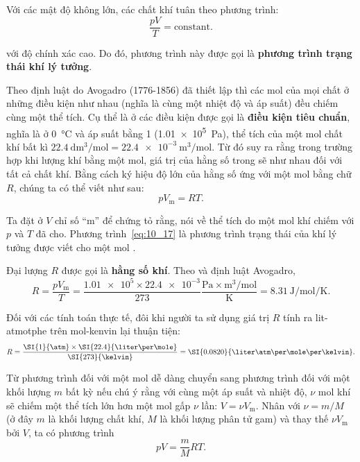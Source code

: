 Với các mật độ không lớn, các chất khí tuân theo phương trình:
\begin{equation}\label{eq:10_16}
	\frac{pV}{T} = \text{constant}.
\end{equation}

\noindent
với độ chính xác cao. Do đó, phương trình này được gọi là \textbf{phương trình trạng thái khí lý tưởng}.

Theo định luật do Avogadro (1776-1856) đã thiết lập thì các mol của mọi chất ở những điều kiện như nhau (nghĩa là cùng một nhiệt độ và áp suất) đều chiếm cùng một thể tích. Cụ thể là ở các điều kiện được gọi là \textbf{điều kiện tiêu chuẩn}, nghĩa là ở \SI{0}{\degreeCelsius} và áp suất bằng \SI{1}{\atm} (\SI{1.01e5}{\pascal}), thể tích của một mol chất khí bất kì $\SI{22.4}{\deci\metre\cubed\per\mole}=\SI{22.4e-3}{\metre\cubed\per\mole}$. Từ đó suy ra rằng trong trường hợp khi lượng khí bằng một mol, giá trị của hằng số trong  sẽ như nhau đối với tất cả chất khí. Bằng cách ký hiệu độ lớn của hằng số ứng với một mol bằng chữ $R$, chúng ta có thể viết  như sau:
\begin{equation}\label{eq:10_17}
	pV_{\text{m}} = RT.
\end{equation}

\noindent
Ta đặt ở $V$ chỉ số ``m'' để chứng tỏ rằng, nói về thể tích do một mol khí chiếm với $p$ và $T$ đã cho. Phương trình~\eqref{eq:10_17} là phương trình trạng thái của khí lý tưởng được viết cho một mol .

Đại lượng $R$ được gọi là \textbf{hằng số khí}. Theo  và định luật Avogadro,
\begin{equation*}
	R = \frac{pV_{\text{m}}}{T} = \frac{\num{1.01e5}\times\num{22.4e-3}}{273}\frac{\si{\pascal}\times\si{\metre\cubed\per\mol}}{\si{\kelvin}} = \SI{8.31}{\joule\per\mole\per\kelvin}.
\end{equation*}

\noindent
Đối với các tính toán thực tế, đôi khi người ta sử dụng giá trị $R$ tính ra lit-atmotphe trên mol-kenvin lại thuận tiện:
\begin{equation*}
	R = \frac{\SI{1}{\atm}\times\SI{22.4}{\liter\per\mole}}{\SI{273}{\kelvin}} = \SI{0.0820}{\liter\atm\per\mole\per\kelvin}.
\end{equation*}

Từ phương trình  đối với một mol dễ dàng chuyển sang phương trình đối với một khối lượng $m$ bất kỳ nếu chú ý rằng với cùng một áp suất và nhiệt độ, $\nu$ mol khí sẽ chiếm một thể tích lớn hơn một mol gấp $\nu$ lần: $V=\nu V_{\text{m}}$. Nhân  với $\nu=m/M$ (ở đây $m$ là khối lượng chất khí, $M$ là khối lượng phân tử gam) và thay thế $\nu V_{\text{m}}$ bởi $V$, ta có phương trình
\begin{equation}\label{eq:10_18}
	pV = \frac{m}{M}RT.
\end{equation}

